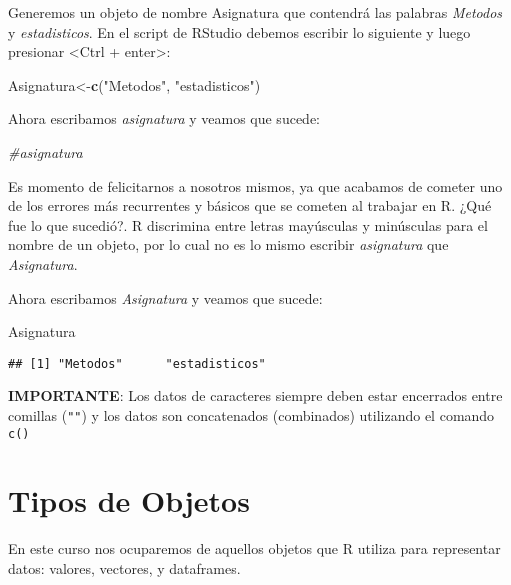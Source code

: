 \documentclass[]{book}
\newenvironment{Shaded}{\begin{snugshade}}{\end{snugshade}}
\newcommand{\CommentTok}[1]{\textcolor[rgb]{0.56,0.35,0.01}{\textit{#1}}}
\newcommand{\KeywordTok}[1]{\textcolor[rgb]{0.13,0.29,0.53}{\textbf{#1}}}
\newcommand{\NormalTok}[1]{#1}
\newcommand{\StringTok}[1]{\textcolor[rgb]{0.31,0.60,0.02}{#1}}
\begin{document}
Generemos un objeto de nombre Asignatura que contendrá las palabras \emph{Metodos} y \emph{estadisticos}. En el script
de RStudio debemos escribir lo siguiente y luego presionar \textless Ctrl + enter\textgreater:

\begin{Shaded}
\begin{Highlighting}[]
\NormalTok{Asignatura<-}\KeywordTok{c}\NormalTok{(}\StringTok{"Metodos"}\NormalTok{, }\StringTok{"estadisticos"}\NormalTok{)}
\end{Highlighting}
\end{Shaded}

Ahora escribamos \emph{asignatura} y veamos que sucede:

\begin{Shaded}
\begin{Highlighting}[]
\CommentTok{#asignatura}
\end{Highlighting}
\end{Shaded}

Es momento de felicitarnos a nosotros mismos, ya que acabamos de cometer uno de los errores más recurrentes y básicos que se cometen al trabajar en R. ¿Qué fue lo que sucedió?. R discrimina entre letras mayúsculas y minúsculas para el nombre de un objeto, por lo cual no es lo mismo escribir \emph{asignatura} que \emph{Asignatura}.

Ahora escribamos \emph{Asignatura} y veamos que sucede:

\begin{Shaded}
\begin{Highlighting}[]
\NormalTok{Asignatura}
\end{Highlighting}
\end{Shaded}

\begin{verbatim}
## [1] "Metodos"      "estadisticos"
\end{verbatim}

\textbf{IMPORTANTE}: Los datos de caracteres siempre deben estar encerrados entre comillas (\texttt{""}) y los datos son concatenados (combinados) utilizando el comando \texttt{c()}

\hypertarget{tipos-de-objetos}{%
\section{Tipos de Objetos}\label{tipos-de-objetos}}

En este curso nos ocuparemos de aquellos objetos que R utiliza para representar datos: valores, vectores, y
dataframes.
\end{document}

